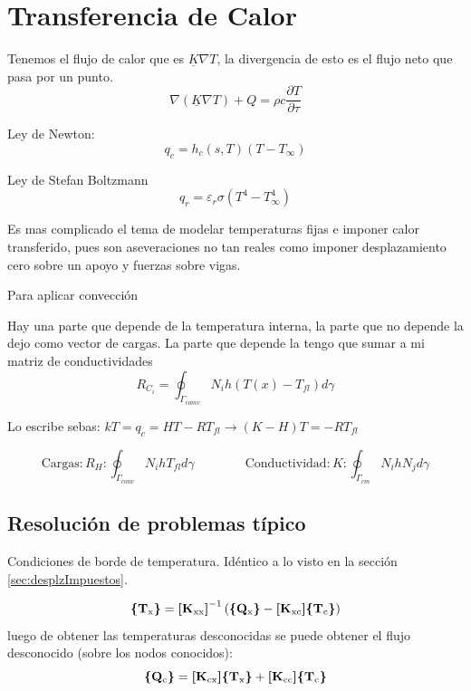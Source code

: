 \section{Transferencia de Calor}

Tenemos el flujo de calor que es $\underline{K} \nabla T$, la divergencia de esto es el flujo neto que pasa por un punto.
\[
\nabla(\underline{K} \nabla T)+Q=\rho c \frac{\partial T}{\partial \tau}
\] 

Ley de Newton: 
\[
q_{c}=h_{c}(s, T)\left(T-T_{\infty}\right)
\]

Ley de Stefan Boltzmann
\[
q_{r}=\varepsilon_{r} \sigma\left(T^{4}-T_{\infty}^{4}\right)
\]

Es mas complicado el tema de modelar temperaturas fijas e imponer calor transferido, pues son aseveraciones no tan reales como imponer desplazamiento cero sobre un apoyo y  fuerzas sobre vigas.

Para aplicar convección 

Hay una parte que depende de la temperatura interna, la parte que no depende la dejo como vector de cargas. La parte que depende la tengo que sumar a mi matriz de conductividades
\[
R_{C_{i}}=\oint_{\Gamma_{c o m v}} N_{i} h\left(T(x)-T_{f l}\right) d \gamma
\]

Lo escribe sebas: $kT=q_c = HT-RT_{fl} \longrightarrow (K-H)T = -R T_{fl}$

\[
\mathrm{Cargas:} R_{H} : \oint_{\Gamma_{c o n v}} N_{i} h T_{f l} d \gamma \qquad \qquad \mathrm{Conductividad:}  K : \oint_{\Gamma_{c m}} N_{i} h N_{j} d \gamma
\]


\subsection*{Resolución de problemas típico}

Condiciones de borde de temperatura. Idéntico a lo visto en la sección \ref{sec:desplzImpuestos}.

\[
\boldsymbol{\{ }\mathbf{T_{\mathrm{x}}} \boldsymbol{\}} = \boldsymbol{[}\mathbf{K_{\mathrm{xx}}} \boldsymbol{]}^{-1} \left( \boldsymbol{\{ }\mathbf{Q_\mathrm{x}} \boldsymbol{\}}- \boldsymbol{[}\mathbf{K_{\mathrm{xc}}} \boldsymbol{]}  \boldsymbol{\{ }\mathbf{T_\mathrm{c}} \boldsymbol{\}} \right)
\]
luego de obtener las temperaturas desconocidas se puede obtener el flujo desconocido (sobre los nodos conocidos):
\[
\boldsymbol{\{ }\mathbf{Q_{\mathrm{c}}} \boldsymbol{\}} = \boldsymbol{[}\mathbf{K_{\mathrm{cx}}} \boldsymbol{]} \boldsymbol{\{ }\mathbf{T_\mathrm{x}} \boldsymbol{\}} + \boldsymbol{[}\mathbf{K_{\mathrm{cc}}} \boldsymbol{]} \boldsymbol{\{ }\mathbf{T_\mathrm{c}} \boldsymbol{\}}  
\]
